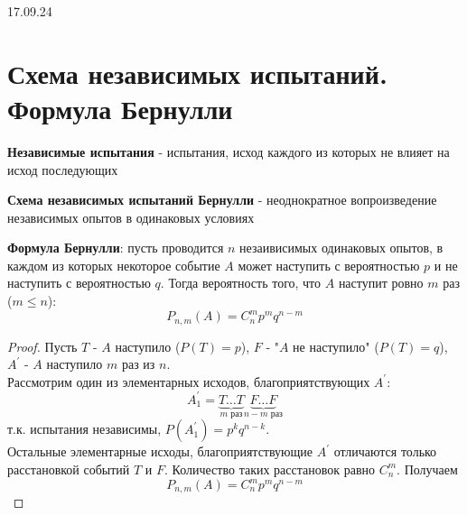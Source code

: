     \vspace{2cm}
    \begin{center}\large{17.09.24}\end{center}
    \section{Схема независимых испытаний. Формула Бернулли}

    \begin{opr}
        \textbf{Независимые испытания} - испытания, исход каждого
        из которых не влияет на исход последующих
    \end{opr}

    \begin{opr}
        \textbf{Схема независимых испытаний Бернулли} - неоднократное
        вопроизведение независимых опытов в одинаковых условиях
    \end{opr}

    \begin{thm}
        \textbf{Формула Бернулли}: пусть проводится \(n\) незаивисимых одинаковых опытов, 
        в каждом из которых некоторое событие \(A\) может наступить с вероятностью \(p\) 
        и не наступить с вероятностью \(q\). Тогда вероятность того, что \(A\) наступит 
        ровно \(m\) раз (\(m \leq n\)):
        \begin{equation}
            P_{n, m}(A) = C^{m}_{n} p^{m} q^{n - m}
        \end{equation}

        \begin{proof}
            Пусть \(T\) - \(A\) наступило (\(P(T) = p\)), \(F\) - "\(A\) не наступило" 
            (\(P(T) = q\)), \(A^{'}\) - \( A \) наступило \(m\) раз из \(n\).\\
            Рассмотрим один из элементарных исходов, благоприятствующих 
            \(A^{'}\):
            \begin{equation}
                A_{1}^{'} = \underbrace{T\dots T}_{\text{\(m\) раз}}
                            \underbrace{F\dots F}_{\text{\(n - m\) раз}}
            \end{equation}
            т.к. испытания независимы, \(P(A_{1}^{'}) = p^{k}q^{n - k}\).\\
            Остальные элементарные исходы, благоприятствующие \(A^{'}\)
            отличаются только расстановкой событий \(T\) и \(F\). Количество таких 
            расстановок равно \(C^{m}_{n}\). Получаем
            \begin{equation}
                P_{n, m}(A) = C^{m}_{n} p^{m} q^{n - m}
            \end{equation}
        \end{proof}
    \end{thm}

